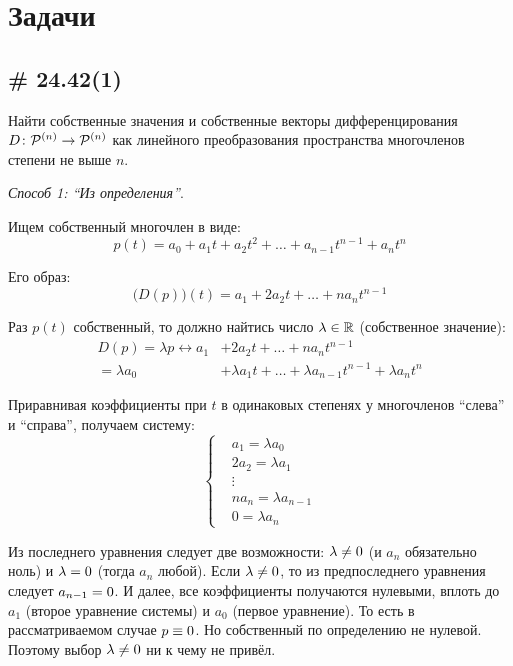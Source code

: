 \documentclass[a4paper,12pt]{article}
\begin{document}
  
  \section{Задачи}
  
  
  \subsection{\# 24.42(1)}
  
  Найти собственные значения и собственные векторы дифференцирования $D\colon \mathcal P^{(n)} \hm\to \mathcal P^{(n)}$ как линейного преобразования пространства многочленов степени не выше $n$.
  
  \begin{solution}
    \hfill\par
    \emph{Способ 1: ``Из определения''}.
    
    Ищем собственный многочлен в виде:
    \begin{equation}\label{eq:p24-42-p-t}
      p(t) = a_0 + a_1 t + a_2 t^2 + \ldots + a_{n - 1} t^{n - 1} + a_n t^n
    \end{equation}
    
    Его образ:
    \[
      \bigl(D(p)\bigr)(t) = a_1 + 2 a_2 t + \ldots + n a_n t^{n - 1}
    \]
    
    Раз $p(t)$ собственный, то должно найтись число $\lambda \hm\in \RR$ (собственное значение):
    \begin{equation}
    \begin{split}
      D(p) = \lambda p
        \leftrightarrow a_1 &+ 2 a_2 t + \ldots + n a_n t^{n - 1}\\
                      = \lambda a_0 &+ \lambda a_1 t + \ldots + \lambda a_{n - 1} t^{n - 1} + \lambda a_n t^n
    \end{split}
    \end{equation}
    
    Приравнивая коэффициенты при $t$ в одинаковых степенях у многочленов ``слева'' и ``справа'', получаем систему:
    \[
      \left\{
        \begin{aligned}
          &a_1 = \lambda a_0\\
          &2 a_2 = \lambda a_1\\
          &\vdots\\
          &n a_n = \lambda a_{n - 1}\\
          &0 = \lambda a_n
        \end{aligned}
      \right.
    \]
    
    Из последнего уравнения следует две возможности: $\lambda \hm{\not=} 0$ (и $a_n$ обязательно ноль) и $\lambda \hm= 0$ (тогда $a_n$ любой).
    Если $\lambda \hm{\not=} 0$, то из предпоследнего уравнения следует $a_{n - 1} \hm= 0$.
    И далее, все коэффициенты получаются нулевыми, вплоть до $a_1$ (второе уравнение системы) и $a_0$ (первое уравнение).
    То есть в рассматриваемом случае $p \hm\equiv 0$.
    Но собственный по определению не нулевой.
    Поэтому выбор $\lambda \hm{\not=} 0$ ни к чему не привёл.
    

\end{solution}
\end{document}

